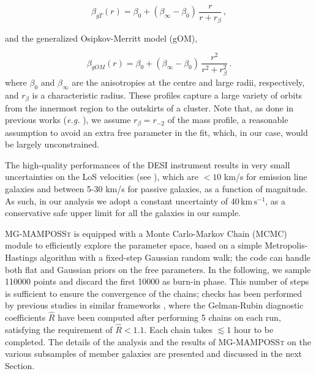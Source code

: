 \documentclass{aa}
\begin{document}
\begin{equation}
    \beta_{gT}(r)=\beta_0 +(\beta_\infty-\beta_0)\, \frac{r}{r +r_\beta} \, ,
    \label{Tiret}
\end{equation}

\noindent and the generalized Osipkov-Merritt model \citep{Osipkov_1979, Merritt_1985} (gOM),

\begin{equation}
    \beta_{gOM}(r)=\beta_0 +(\beta_\infty-\beta_0)\, \frac{r^2}{r^2 +r_\beta^2} \, .
    \label{Osipkov-Merritt}
\end{equation}
where $\beta_0$ and $\beta_\infty$ are the anisotropies at the centre and large radii, respectively, and $r_\beta$ is a characteristic radius. These profiles capture a large variety of orbits from the innermost region to the outskirts of a cluster. Note that, as done in previous works (\textit{e.g.} \citealt{Mamon_2019,Biviano24}), we assume $r_\beta= r_{-2}$ of the mass profile, a reasonable assumption to avoid an extra free parameter in the fit, which, in our case, would be largely unconstrained.

The high-quality performances of the DESI instrument results in very small uncertainties on the LoS velocities (see \citealt{DESI_DR1}), which are $<10$ km/s for emission line galaxies and between 5-30 km/s for passive galaxies, as a function of magnitude. As such, in our analysis we adopt a constant uncertainty of $40 \, \mathrm{km \, s^{-1}}$, as a conservative safe upper limit for all the galaxies in our sample.

\textsc{MG-MAMPOSSt} is equipped with a Monte Carlo-Markov Chain (MCMC) module to efficiently explore the parameter space, based on a simple Metropolis-Hastings algorithm with a fixed-step Gaussian random walk; the code can handle both flat and Gaussian priors on the free parameters. In the following, we sample 110000 points and discard the first 10000 as burn-in phase. 
This number of steps is sufficient to ensure the convergence of the chains; checks has been performed by previous studies in similar frameworks \citep{Pizzuti_2024,Biviano25}, where the Gelman-Rubin diagnostic coefficients $\hat{R}$ \citep{Gelman_1992} have been computed after performing 5 chains on each run, satisfying the requirement of $\hat{R}<1.1$. Each chain takes $\lesssim 1 $ hour to be completed.
The details of the analysis and the results of \textsc{MG-MAMPOSSt} on the various subsamples of member galaxies are presented and discussed in the next Section.
\end{document}
